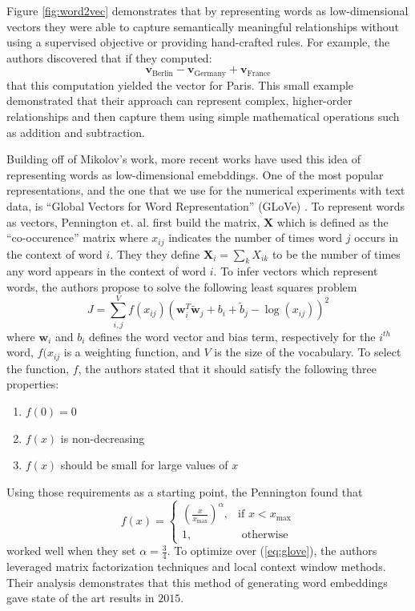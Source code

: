 \documentclass[../thesis.tex]{subfiles}
\begin{document}
Figure \ref{fig:word2vec} demonstrates that by representing words as
low-dimensional vectors they were able to capture semantically meaningful
relationships without using a supervised objective or providing hand-crafted
rules. For example, the authors discovered that if they computed:
\begin{equation*}
    \mathbf{v}_{\text{Berlin}} - \mathbf{v}_{\text{Germany}} +
    \mathbf{v}_{\text{France}}
\end{equation*}
that this computation yielded the vector for Paris. This small example
demonstrated that their approach can represent complex, higher-order
relationships and then capture them using simple mathematical operations such as
addition and subtraction.

Building off of Mikolov's work, more recent works have used this idea of
representing words as low-dimensional emebddings. One of the most popular
representations, and the one that we use for the numerical experiments with text
data, is ``Global Vectors for Word Representation'' (GLoVe)
\cite{pennington2014glove}. To represent words as vectors, Pennington et. al.
first build the matrix, $\mathbf{X}$ which is defined as the ``co-occurence''
matrix where $x_{ij}$ indicates the number of times word $j$ occurs in the
context of word $i$. They they define $\mathbf{X}_i = \sum_k X_{ik}$ to be the
number of times any word appears in the context of word $i$. To infer vectors
which represent words, the authors propose to solve the following least squares
problem
\begin{equation}
    \label{eq:glove}
    J = \sum_{i, j}^V f(x_{ij})\left(\mathbf{w}_i^T \tilde{\mathbf{w}}_j + b_i +
    \tilde{b}_j - \log\left(x_{ij}\right) \right)^2
\end{equation}
where $\mathbf{w}_i$ and $b_i$ defines the word vector and bias term,
respectively for the $i^{th}$ word, $f(x_{ij}$ is a weighting function, and $V$
is the size of the vocabulary. To select the function, $f$, the authors stated
that it should satisfy the following three properties:
\begin{enumerate}
    \item $f(0) = 0$
    \item $f(x)$ is non-decreasing
    \item $f(x)$ should be small for large values of $x$
\end{enumerate}
Using those requirements as a starting point, the Pennington found that
\begin{equation}
    \label{eq:glove_function}
    f(x) =
    \begin{cases}
        \left(\frac{x}{x_{\text{max}}}\right)^\alpha, &\text{if } x < x_{\text{max}} \\
        1, &\text{ otherwise}
    \end{cases}
\end{equation}
worked well when they set $\alpha = \frac{3}{4}$. To optimize over
(\ref{eq:glove}), the authors leveraged matrix factorization techniques and
local context window methods. Their analysis demonstrates that this method of
generating word embeddings gave state of the art results in $2015$.
\end{document}
